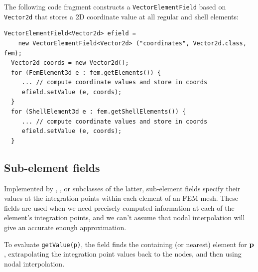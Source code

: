 The following code fragment constructs a {\tt VectorElementField}
based on {\tt Vector2d} that stores a 2D coordinate value at all
regular and shell elements:
%
\begin{lstlisting}[]
  VectorElementField<Vector2d> efield =
    new VectorElementField<Vector2d> ("coordinates", Vector2d.class, fem);
  Vector2d coords = new Vector2d();
  for (FemElement3d e : fem.getElements()) {
     ... // compute coordinate values and store in coords
     efield.setValue (e, coords);
  }
  for (ShellElement3d e : fem.getShellElements()) {
     ... // compute coordinate values and store in coords
     efield.setValue (e, coords);
  }
\end{lstlisting}
%

\subsection{Sub-element fields}

Implemented by
,
, 
or subclasses of the latter, sub-element fields specify their values
at the integration points within each element of an FEM mesh. These
fields are used when we need precisely computed information at each of
the element's integration points, and we can't assume that nodal
interpolation will give an accurate enough approximation.

To evaluate {\tt getValue(p)}, the field finds the containing (or
nearest) element for ${\bf p}$, extrapolating the integration point values
back to the nodes, and then using nodal interpolation.

